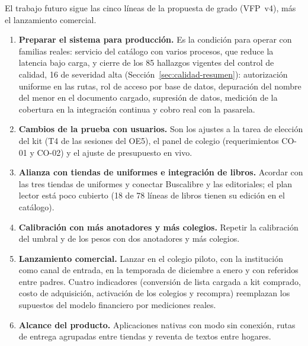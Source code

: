 El trabajo futuro sigue las cinco líneas de la propuesta de grado (VFP~v4), más el lanzamiento comercial.
\begin{enumerate}
\item \textbf{Preparar el sistema para producción.} Es la condición para operar con familias reales: servicio del catálogo con varios procesos, que reduce la latencia bajo carga, y cierre de los 85 hallazgos vigentes del control de calidad, 16 de severidad alta (Sección~\ref{sec:calidad-resumen}): autorización uniforme en las rutas, rol de acceso por base de datos, depuración del nombre del menor en el documento cargado, supresión de datos, medición de la cobertura en la integración continua y cobro real con la pasarela.
\item \textbf{Cambios de la prueba con usuarios.} Son los ajustes a la tarea de elección del kit (T4 de las sesiones del OE5), el panel de colegio (requerimientos CO-01 y CO-02) y el ajuste de presupuesto en vivo.
\item \textbf{Alianza con tiendas de uniformes e integración de libros.} Acordar con las tres tiendas de uniformes y conectar Buscalibre y las editoriales; el plan lector está poco cubierto (18 de 78 líneas de libros tienen su edición en el catálogo).
\item \textbf{Calibración con más anotadores y más colegios.} Repetir la calibración del umbral y de los pesos con dos anotadores y más colegios.
\item \textbf{Lanzamiento comercial.} Lanzar en el colegio piloto, con la institución como canal de entrada, en la temporada de diciembre a enero y con referidos entre padres. Cuatro indicadores (conversión de lista cargada a kit comprado, costo de adquisición, activación de los colegios y recompra) reemplazan los supuestos del modelo financiero por mediciones reales.
\item \textbf{Alcance del producto.} Aplicaciones nativas con modo sin conexión, rutas de entrega agrupadas entre tiendas y reventa de textos entre hogares.
\end{enumerate}
